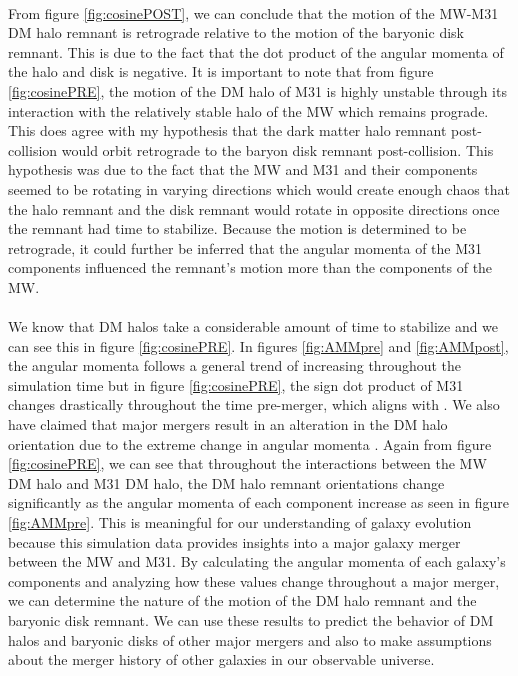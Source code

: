 \documentclass[fleqn,usenatbib]{mnras}
\begin{document}
\paragraph{} From figure \ref{fig:cosinePOST}, we can conclude that the motion of the MW-M31 DM halo remnant is retrograde relative to the motion of the baryonic disk remnant. This is due to the fact that the dot product of the angular momenta of the halo and disk is negative. It is important to note that from figure \ref{fig:cosinePRE}, the motion of the DM halo of M31 is highly unstable through its interaction with the relatively stable halo of the MW which remains prograde. This does agree with my hypothesis that the dark matter halo remnant post-collision would orbit retrograde to the baryon disk remnant post-collision. This hypothesis was due to the fact that the MW and M31 and their components seemed to be rotating in varying directions which would create enough chaos that the halo remnant and the disk remnant would rotate in opposite directions once the remnant had time to stabilize. Because the motion is determined to be retrograde, it could further be inferred that the angular momenta of the M31 components influenced the remnant's motion more than the components of the MW.

\paragraph{} We know that DM halos take a considerable amount of time to stabilize \citep{Drakos+2019} and we can see this in figure \ref{fig:cosinePRE}. In figures \ref{fig:AMMpre} and \ref{fig:AMMpost}, the angular momenta follows a general trend of increasing throughout the simulation time but in figure \ref{fig:cosinePRE}, the sign dot product of M31 changes drastically throughout the time pre-merger, which aligns with \citep{Drakos+2019}. We also have claimed that major mergers result in an alteration in the DM halo orientation due to the extreme change in angular momenta \citep{Baptista+2023}. Again from figure \ref{fig:cosinePRE}, we can see that throughout the interactions between the MW DM halo and M31 DM halo, the DM halo remnant orientations change significantly as the angular momenta of each component increase as seen in figure \ref{fig:AMMpre}. This is meaningful for our understanding of galaxy evolution because this simulation data provides insights into a major galaxy merger between the MW and M31. By calculating the angular momenta of each galaxy's components and analyzing how these values change throughout a major merger, we can determine the nature of the motion of the DM halo remnant and the baryonic disk remnant. We can use these results to predict the behavior of DM halos and baryonic disks of other major mergers and also to make assumptions about the merger history of other galaxies in our observable universe. 
\end{document}
